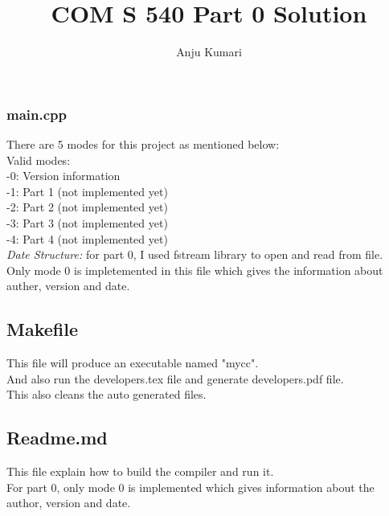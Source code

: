 \documentclass{article}
\title{COM S 540 Part 0 Solution}
\author{Anju Kumari}
\date{}
\begin{document}
   

\maketitle
\section*{}

\subsubsection*{main.cpp}
There are 5 modes for this project as mentioned below: \\
Valid modes: \\
-0: Version information \\
-1: Part 1 (not implemented yet) \\
-2: Part 2 (not implemented yet) \\
-3: Part 3 (not implemented yet) \\
-4: Part 4 (not implemented yet) \\

{\it Date Structure:} for part 0, I used fstream library to open and read from file. \\
Only mode 0 is impletemented in this file which gives the information about auther, version and date. \\
\subsection*{Makefile}
This file will produce an executable named "mycc". \\
And also run the developers.tex file and generate developers.pdf file. \\
This also cleans the auto generated files. \\

\subsection*{Readme.md}
This file explain how to build the compiler and run it. \\
For part 0, only mode 0 is implemented which gives information about the author, version and date. \\
\end{document}
